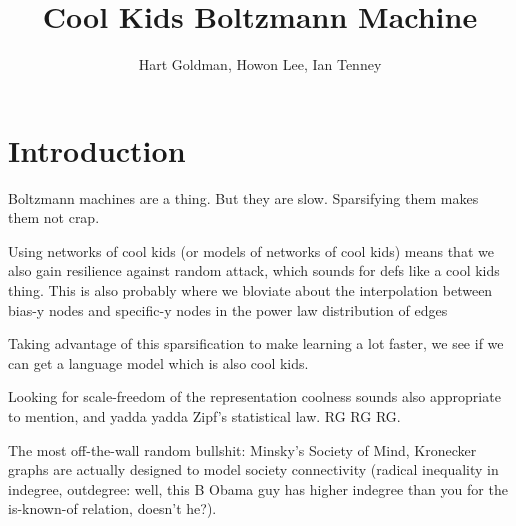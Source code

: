 \documentclass[12pt]{article}
\begin{document}
\title{Cool Kids Boltzmann Machine}
\author{Hart Goldman, Howon Lee, Ian Tenney}
\maketitle

\section{Introduction}
Boltzmann machines are a thing. But they are slow. Sparsifying them makes them not crap.

Using networks of cool kids (or models of networks of cool kids) means that we also gain resilience against random attack, which sounds for defs like a cool kids thing. This is also probably where we bloviate about the interpolation between bias-y nodes and specific-y nodes in the power law distribution of edges

Taking advantage of this sparsification to make learning a lot faster, we see if we can get a language model which is also cool kids.

Looking for scale-freedom of the representation coolness sounds also appropriate to mention, and yadda yadda Zipf's statistical law. RG RG RG.

The most off-the-wall random bullshit: Minsky's Society of Mind, Kronecker graphs are actually designed to model society connectivity (radical inequality in indegree, outdegree: well, this B Obama guy has higher indegree than you for the is-known-of relation, doesn't he?).
\end{document}
